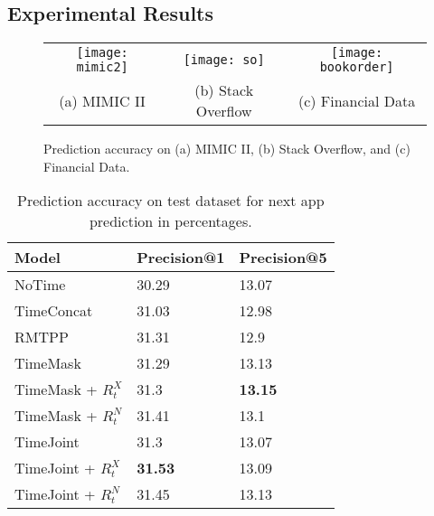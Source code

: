 \documentclass{article} %
\begin{document}
\subsection{Experimental Results}
\begin{figure*}[t]
	\centering
	\renewcommand{\tabcolsep}{2pt}
	\begin{tabular}{ccc}
		\texttt{[image: mimic2]} & 
		\texttt{[image: so]} & 
		\texttt{[image: bookorder]} 
		\\
		(a) MIMIC II & (b) Stack Overflow & (c) Financial Data 
	\end{tabular}
	\vspace{-2mm}
	\caption{\label{real} Prediction accuracy on (a) MIMIC II, (b) Stack Overflow, and (c) Financial Data.}
\end{figure*}
\begin{table}[h!]
   \caption{Prediction accuracy on test dataset for next app prediction in percentages.\label{tbl_app}}
   \label{sample-table}
   \centering
   \begin{tabular}{lll}
     \toprule
     \cmidrule{1-3}
     Model & Precision@1 & Precision@5 \\
     \midrule
     NoTime  & 30.29 & 13.07  \\
     TimeConcat & 31.03 & 12.98 \\
     RMTPP & 31.31 & 12.9 \\
     TimeMask & 31.29 & 13.13  \\
     TimeMask + $R_{t}^X$ & 31.3 & \textbf{13.15} \\
     TimeMask + $R_{t}^N$ & 31.41 & 13.1 \\
     TimeJoint & 31.3 & 13.07  \\
     TimeJoint + $R_{t}^X$ & \textbf{31.53} & 13.09 \\
     TimeJoint + $R_{t}^N$ & 31.45 & 13.13 \\
     \bottomrule
   \end{tabular}
\end{table}
\end{document}
